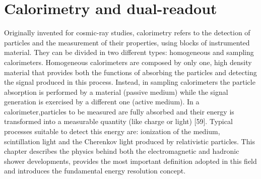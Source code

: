 \chapter{Calorimetry and dual-readout}
Originally invented for cosmic-ray studies, calorimetry refers to the detection of particles and the measurement of their properties, using blocks of instrumented material.
They can be divided in two different types: homogeneous and sampling calorimeters.
Homogeneous calorimeters are composed by only one, high density material that provides both the functions of absorbing the particles and detecting the signal produced in this process.
Instead, in sampling calorimeters the particle absorption is performed by a material (passive medium) while the signal generation is exercised by a different one (active medium).
In a calorimeter,particles to be measured are fully absorbed and their energy is transformed into a measurable quantity (like charge or light) [59].
Typical processes suitable to detect this energy are: ionization of the medium, scintillation light and the Cherenkov light produced by relativistic particles.
This chapter describes the physics behind both the electromagnetic and hadronic shower developments, provides the most important definition adopted in this field and introduces the fundamental energy resolution concept.\\


